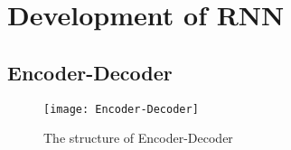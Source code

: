 
	\section{Development of RNN}
	
	\subsection{Encoder-Decoder}
		\begin{figure}[H]
			\centering
			\texttt{[image: Encoder-Decoder]}
			\caption{The structure of Encoder-Decoder}
		\end{figure}

